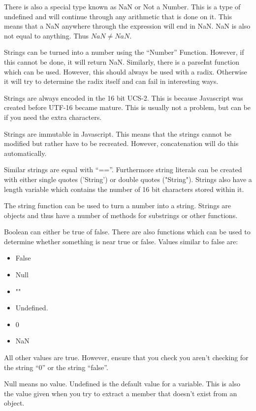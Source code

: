 			There is also a special type known as NaN or Not a Number. 
			This is a type of undefined and will continue through any arithmetic that is done on it. 
			This means that a NaN anywhere through the expression will end in NaN. 
			NaN is also not equal to anything. 
			Thus $NaN \ne NaN$. 
			
			Strings can be turned into a number using the ``Number'' Function. 
			However, if this cannot be done, it will return NaN. 
			Similarly, there is a parseInt function which can be used. 
			However, this should always be used with a radix. 
			Otherwise it will try to determine the radix itself and can fail in interesting ways. 

			Strings are always encoded in the 16 bit UCS-2. 
			This is because Javascript was created before UTF-16 became mature. 
			This is usually not a problem, but can be if you need the extra characters. 

			Strings are immutable in Javascript. 
			This means that the strings cannot be modified but rather have to be recreated. 
			However, concatenation will do this automatically. 

			Similar strings are equal with ``==''. 
			Furthermore string literals can be created with either single quotes ('String') or double quotes ("String"). 
			Strings also have a length variable which contains the number of 16 bit characters stored within it. 

			The string function can be used to turn a number into a string. 
			Strings are objects and thus have a number of methods for substrings or other functions. 

			Boolean can either be true of false. 
			There are also functions which can be used to determine whether something is near true or false. 
			Values similar to false are:
			\begin{itemize}
				\item False
				\item Null
				\item ""
				\item Undefined. 
				\item 0
				\item NaN
			\end{itemize}
			All other values are true. 
			However, ensure that you check you aren't checking for the string ``0'' or the string ``false''. 

			Null means no value. 
			Undefined is the default value for a variable. 
			This is also the value given when you try to extract a member that doesn't exist from an object. 
			
